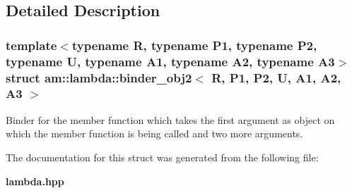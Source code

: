 \subsection{Detailed Description}
\subsubsection*{template$<$typename R, typename P1, typename P2, typename U, typename A1, typename A2, typename A3$>$ struct am::lambda::binder\_\-obj2$<$ R, P1, P2, U, A1, A2, A3 $>$}

Binder for the member function which takes the first argument as object on which the member function is being called and two more arguments. 



The documentation for this struct was generated from the following file:\begin{CompactItemize}
\item 
{\bf lambda.hpp}\end{CompactItemize}
